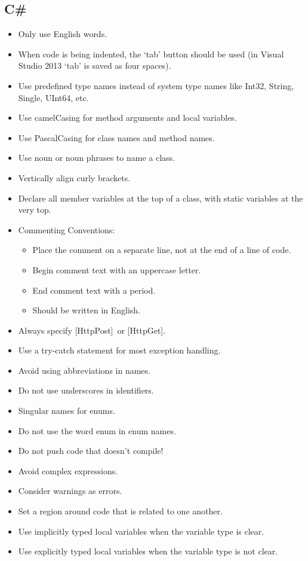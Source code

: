 \documentclass[paper=a4, fontsize=11pt]{scrartcl} %
\numberwithin{equation}{section} %
\numberwithin{figure}{section} %
\numberwithin{table}{section} %
\begin{document}
  \subsection{C\#}
  \begin{itemize}
    \item Only use English words.
    \item When code is being indented, the `tab' button should be used (in Visual Studio 2013 `tab' is saved as four spaces).
    \item Use predefined type names instead of system type names like Int32, String, Single, UInt64, etc.
    \item Use camelCasing for method arguments and local variables.
    \item Use PascalCasing for class names and method names.
    \item Use noun or noun phrases to name a class.
    \item Vertically align curly brackets.
    \item Declare all member variables at the top of a class, with static variables at the very top.
    \item Commenting Conventions:
    \begin{itemize}
    \item Place the comment on a separate line, not at the end of a line of code.
    \item Begin comment text with an uppercase letter.
    \item End comment text with a period.
    \item Should be written in English.
    \end{itemize}
    \item Always specify [HttpPost] or [HttpGet].
    \item Use a try-catch statement for most exception handling.
    \item Avoid using abbreviations in names.
    \item Do not use underscores in identifiers.
    \item Singular names for enums.
    \item Do not use the word enum in enum names.
    \item Do not push code that doesn’t compile!
    \item Avoid complex expressions.
    \item Consider warnings as errors.
    \item Set a region around code that is related to one another.
    \item Use implicitly typed local variables when the variable type is clear.
    \item Use explicitly typed local variables when the variable type is not clear.
  \end{itemize}
  
\end{document}
